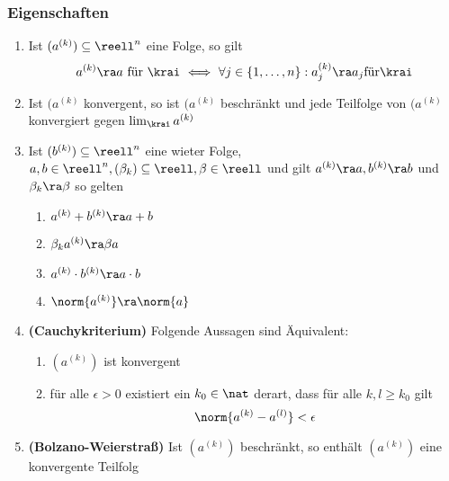 \documentclass{kit}
\begin{document}
    \subsubsection{Eigenschaften} 
      \begin{enumerate}
        \item Ist $(a^{(k)})\subseteq\reell^n$ eine Folge, so gilt
          $$a^{(k)}\ra a\text{ für }\krai\ \Longleftrightarrow\ \forall j\in\{1,\dots,n\}:a_j^{(k)}\ra a_j\text{für}\krai$$
        \item Ist $(a^{(k)}$ konvergent, so ist $(a^{(k)}$ beschränkt und jede Teilfolge von $(a^{(k)}$ konvergiert gegen
          $\lim_\krai a^{(k)}$
        \item Ist $(b^{(k)})\subseteq\reell^n$ eine wieter Folge, $a,b\in\reell^n,(\beta_k)\subseteq\reell,\beta\in\reell$
          und gilt $a^{(k)}\ra a,b^{(k)}\ra b$ und $\beta_k\ra\beta$ so gelten
          \begin{enumerate}[label=\roman*)]
            \item $a^{(k)}+b^{(k)}\ra a+b$
            \item $\beta_ka^{(k)}\ra\beta a$
            \item $a^{(k)}\cdot b^{(k)}\ra a\cdot b$
            \item $\norm{a^{(k)}}\ra\norm{a}$
          \end{enumerate}
        \item \textbf{(Cauchykriterium)} Folgende Aussagen sind Äquivalent:
          \begin{enumerate}[label=\roman*)]
            \item $(a^{(k)})$ ist konvergent
            \item für alle $\epsilon>0$ existiert ein $k_0\in\nat$ derart, dass für alle $k,l\ge k_0$ gilt
              $$\norm{a^{(k)}-a^{(l)}}<\epsilon$$
          \end{enumerate}
        \item \textbf{(Bolzano-Weierstraß)} Ist $(a^{(k)})$ beschränkt, so enthält $(a^{(k)})$ eine konvergente Teilfolg
      \end{enumerate}
\end{document}
